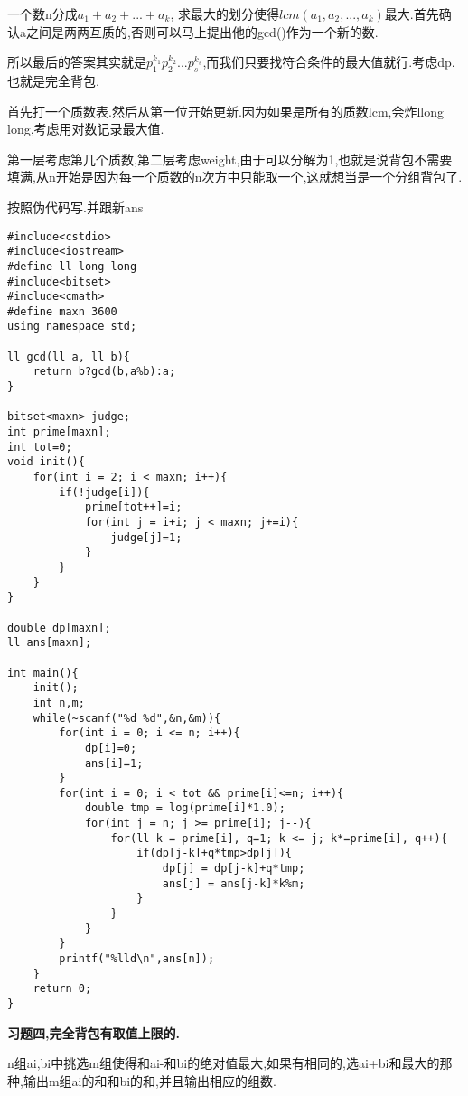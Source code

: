 一个数n分成$a_1+a_2+...+a_k$, 求最大的划分使得$lcm(a_1,a_2,...,a_k)$最大.首先确认a之间是两两互质的,否则可以马上提出他的gcd()作为一个新的数.

所以最后的答案其实就是$p_1^{k_1}p_2^{k_2} ...p_s^{k_s}$,而我们只要找符合条件的最大值就行.考虑dp.也就是完全背包.

首先打一个质数表.然后从第一位开始更新.因为如果是所有的质数lcm,会炸llong long,考虑用对数记录最大值.

第一层考虑第几个质数,第二层考虑weight,由于可以分解为1,也就是说背包不需要填满,从n开始是因为每一个质数的n次方中只能取一个,这就想当是一个分组背包了.

按照伪代码写.并跟新ans

\begin{lstlisting}
#include<cstdio>
#include<iostream>
#define ll long long
#include<bitset>
#include<cmath>
#define maxn 3600
using namespace std;

ll gcd(ll a, ll b){
    return b?gcd(b,a%b):a;
}

bitset<maxn> judge;
int prime[maxn];
int tot=0;
void init(){
    for(int i = 2; i < maxn; i++){
        if(!judge[i]){
            prime[tot++]=i;
            for(int j = i+i; j < maxn; j+=i){
                judge[j]=1;
            }
        }
    }
}

double dp[maxn];
ll ans[maxn];

int main(){
    init();
    int n,m;
    while(~scanf("%d %d",&n,&m)){
        for(int i = 0; i <= n; i++){
            dp[i]=0;
            ans[i]=1;
        }
        for(int i = 0; i < tot && prime[i]<=n; i++){
            double tmp = log(prime[i]*1.0);
            for(int j = n; j >= prime[i]; j--){
                for(ll k = prime[i], q=1; k <= j; k*=prime[i], q++){
                    if(dp[j-k]+q*tmp>dp[j]){
                        dp[j] = dp[j-k]+q*tmp;
                        ans[j] = ans[j-k]*k%m;
                    }
                }
            }
        }
        printf("%lld\n",ans[n]);
    }
    return 0;
}
\end{lstlisting}




{\bfseries 习题四,完全背包有取值上限的.}

n组ai,bi中挑选m组使得和ai-和bi的绝对值最大,如果有相同的,选ai+bi和最大的那种,输出m组ai的和和bi的和,并且输出相应的组数.

